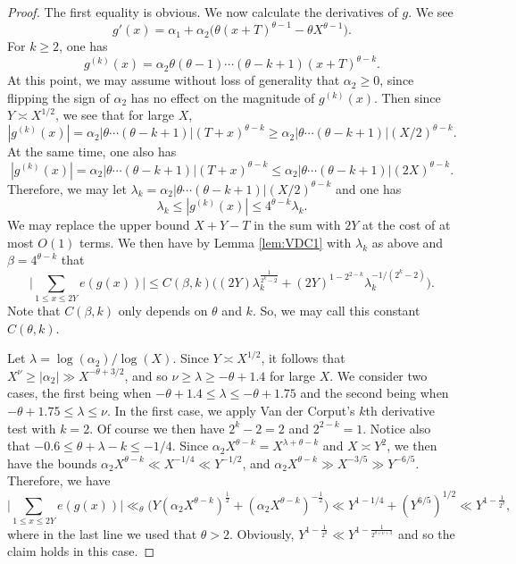 \documentclass[11pt,reqno]{amsart}
\numberwithin{equation}{section}
\begin{document}
\begin{proof} The first equality is obvious. We now calculate the derivatives of $g$. We see 
\[ g'(x) = \alpha_1 + \alpha_2 \big( \theta(x+T)^{\theta-1}-\theta X^{\theta-1} \big). \]
For $k \geq 2$, one has 
\[ g^{(k)}(x) = \alpha_2 \theta(\theta-1)\cdots (\theta-k+1)(x+T)^{\theta-k}. \]
At this point, we may assume without loss of generality that $\alpha_2 \geq 0$, since flipping the sign of $\alpha_2$ has no effect on the magnitude of $g^{(k)}(x)$. Then since $Y \asymp X^{1/2}$, we see that for large $X$,
\[ |g^{(k)}(x)| = \alpha_2 |\theta \cdots (\theta-k+1)|(T+x)^{\theta-k} \geq \alpha_2 |\theta \cdots (\theta-k+1)| (X/2)^{\theta-k}.  \]
At the same time, one also has 
\[ |g^{(k)}(x)| = \alpha_2 |\theta \cdots (\theta-k+1)|(T+x)^{\theta-k} \leq \alpha_2 |\theta \cdots (\theta-k+1)| (2X)^{\theta-k}. \]
Therefore, we may let $\lambda_k = \alpha_2 |\theta \cdots (\theta-k+1)| (X/2)^{\theta-k}$ and one has 
\[ \lambda_k \leq |g^{(k)}(x)| \leq 4^{\theta-k}\lambda_k. \]
We may replace the upper bound $X+Y-T$ in the sum with $2Y$ at the cost of at most $O(1)$ terms. We then have by Lemma \ref{lem:VDC1} with $\lambda_k$ as above and $\beta = 4^{\theta-k}$ that 
\[ \Big|\sum_{1 \leq x \leq 2Y} e(g(x)) \Big| \leq C(\beta, k) \big( (2Y)\lambda_k^{\frac{1}{2^k-2}} + (2Y)^{1-2^{2-k}} \lambda_k^{-1/(2^k-2)} \big). \]
Note that $C(\beta,k)$ only depends on $\theta$ and $k$. So, we may call this constant $C(\theta, k)$.

Let $\lambda = \log(\alpha_2)/\log(X) $. Since $Y \asymp X^{1/2}$, it follows that $ X^{\nu} \geq |\alpha_2| \gg X^{-\theta+3/2}$, and so $\nu \geq \lambda \geq -\theta+1.4$ for large $X$. We consider two cases, the first being when $-\theta+1.4 \leq \lambda \leq -\theta+1.75$ and the second being when $-\theta + 1.75 \leq \lambda \leq \nu$. In the first case, we apply Van der Corput's $k$th derivative test with $k = 2$. Of course we then have $2^k-2 = 2$ and $2^{2-k}=1$. Notice also that $-0.6 \leq \theta+\lambda-k \leq -1/4 $. Since $\alpha_2X^{\theta-k} = X^{\lambda+\theta-k}$ and $X \asymp Y^2$, we then have the bounds $\alpha_2 X^{\theta-k} \ll X^{-1/4} \ll Y^{-1/2}$, and $\alpha_2X^{\theta-k} \gg X^{-3/5} \gg Y^{-6/5}$. Therefore, we have 
\[ \Big|\sum_{1 \leq x \leq 2Y} e(g(x))\Big| \ll_{\theta} \big( Y(\alpha_2X^{\theta-k})^{\frac{1}{2}}+(\alpha_2X^{\theta-k})^{-\frac{1}{2}}\big) \ll Y^{1-1/4}+(Y^{6/5})^{1/2} \ll Y^{1-\frac{1}{2^\theta}}, \]
where in the last line we used that $\theta > 2$. Obviously, $Y^{1-\frac{1}{2^{\theta}}} \ll Y^{1-\frac{1}{2^{\theta+\nu+3}} } $ and so the claim holds in this case. 


\end{proof}
\end{document}
